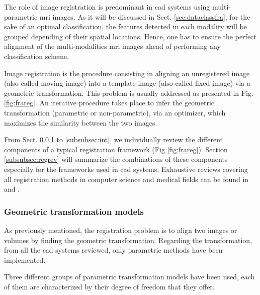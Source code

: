 The role of image registration is predominant in \ac{cad} systems using multi-parametric \ac{mri} images. As it will be discussed in Sect. \ref{sec:dataclassfra}, for the sake of an optimal classification, the features detected in each modality will be grouped depending of their spatial locations. Hence, one has to ensure the perfect alignment of the multi-modalities \ac{mri} images ahead of performing any classification scheme.

Image registration is the procedure consisting in aligning an unregistered image (also called moving image) into a template image (also called fixed image) via a geometric transformation. This problem is usually addressed as presented in Fig. \ref{fig:frareg}. An iterative procedure takes place to infer the geometric transformation (parametric or non-parametric), via an optimizer, which maximizes the similarity between the two images.

From Sect. \ref{subsubsec:geotra} to \ref{subsubsec:int}, we individually review the different components of a typical registration framework (Fig \ref{fig:frareg}). Section \ref{subsubsec:regrev} will summarize the combinations of these components especially for the frameworks used in \ac{cad} systems. Exhaustive reviews covering all registration methods in computer science and medical fields can be found in \cite{Maintz1998} and \cite{Zitova2003}.

\subsubsection{Geometric transformation models}\label{subsubsec:geotra}

As previously mentioned, the registration problem is to align two images or volumes by finding the geometric transformation. Regarding the transformation, from all the \ac{cad} systems reviewed, only parametric methods have been implemented.

Three different groups of parametric transformation models have been used, each of them are characterized by their degree of freedom that they offer.

